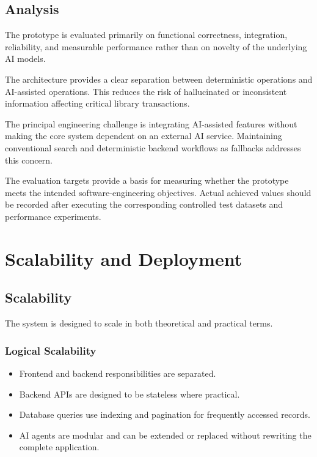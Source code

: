 \documentclass{tietreport}
\begin{document}
\section{Analysis}

The prototype is evaluated primarily on functional correctness,
integration, reliability, and measurable performance rather than on
novelty of the underlying AI models.

The architecture provides a clear separation between deterministic
operations and AI-assisted operations. This reduces the risk of
hallucinated or inconsistent information affecting critical library
transactions.

The principal engineering challenge is integrating AI-assisted features
without making the core system dependent on an external AI service.
Maintaining conventional search and deterministic backend workflows as
fallbacks addresses this concern.

The evaluation targets provide a basis for measuring whether the prototype
meets the intended software-engineering objectives. Actual achieved values
should be recorded after executing the corresponding controlled test
datasets and performance experiments.


\chapter{Scalability and Deployment}

\section{Scalability}

The system is designed to scale in both theoretical and practical terms.

\subsection{Logical Scalability}

\begin{itemize}

    \item Frontend and backend responsibilities are separated.

    \item Backend APIs are designed to be stateless where practical.

    \item Database queries use indexing and pagination for frequently
    accessed records.

    \item AI agents are modular and can be extended or replaced without
    rewriting the complete application.

\end{itemize}
\end{document}
